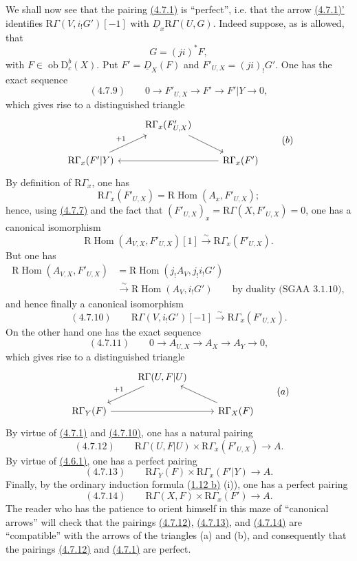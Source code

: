 \documentclass[11pt]{article}
\DeclareMathOperator{\Hom}{Hom}
\newcommand{\R}{\mathrm{R}}
\newcommand{\D}{\mathrm{D}}
\newcommand{\ob}{\operatorname{ob}}
\providecommand{\Hom}{\operatorname{Hom}}
\providecommand{\ob}{\operatorname{ob}}
\providecommand{\R}{\mathrm R}
\providecommand{\Hom}{\operatorname{Hom}}
\begin{document}
We shall now see that the pairing \hyperref[sga5:I:equation:4.7.1]{(4.7.1)} is ``perfect'', i.e. that the arrow \hyperref[sga5:I:equation:4.7.1:2]{(4.7.1)'} identifies $\R\Gamma(V,i_!G')[-1]$ with $\underline{D}_x\R\Gamma(U,G)$. Indeed suppose, as is allowed, that
\[
G=(ji)^*F,
\]
with $F\in\ob\D_c^b(X)$. Put $F'=\underline{D}_X(F)$ and $F'_{U,X}=(ji)_!G'$. One has the exact sequence
\label{sga5:I:equation:4.7.9}\[
(4.7.9)\qquad 0\longrightarrow F'_{U,X}\longrightarrow F'\longrightarrow F'|Y\longrightarrow0,
\]
which gives rise to a distinguished triangle
\[
\begin{tikzcd}
& \R\Gamma_x(F'_{U,X}) \arrow[dr] \\
\R\Gamma_x(F'|Y) \arrow[ur,"{+1}"] && \R\Gamma_x(F') \arrow[ll]
\end{tikzcd}
\qquad (b)
\]
By definition of $\R\Gamma_x$, one has
\[
\R\Gamma_x(F'_{U,X})=\R\Hom(A_x,F'_{U,X});
\]
hence, using \hyperref[sga5:I:equation:4.7.7]{(4.7.7)} and the fact that $(F'_{U,X})_x=\R\Gamma(X,F'_{U,X})=0$, one has a canonical isomorphism
\[
\R\Hom(A_{V,X},F'_{U,X})[1]\xrightarrow{\sim}\R\Gamma_x(F'_{U,X}).
\]
But one has
\[
\begin{aligned}
\R\Hom(A_{V,X},F'_{U,X})&=\R\Hom(j_!A_V,j_!i_!G')\\
&\xrightarrow{\sim}\R\Hom(A_V,i_!G')\qquad\text{by duality (SGAA~3.1.10)},
\end{aligned}
\]
and hence finally a canonical isomorphism
\label{sga5:I:equation:4.7.10}\[
(4.7.10)\qquad \R\Gamma(V,i_!G')[-1]\xrightarrow{\sim}\R\Gamma_x(F'_{U,X}).
\]
On the other hand one has the exact sequence
\label{sga5:I:equation:4.7.11}\[
(4.7.11)\qquad 0\longrightarrow A_{U,X}\longrightarrow A_X\longrightarrow A_Y\longrightarrow0,
\]
which gives rise to a distinguished triangle
\[
\begin{tikzcd}
& \R\Gamma(U,F|U) \arrow[dl,"{+1}"'] \\
\R\Gamma_Y(F) \arrow[rr] && \R\Gamma_X(F) \arrow[ul]
\end{tikzcd}
\qquad (a)
\]
By virtue of \hyperref[sga5:I:equation:4.7.1]{(4.7.1)} and \hyperref[sga5:I:equation:4.7.10]{(4.7.10)}, one has a natural pairing
\label{sga5:I:equation:4.7.12}\[
(4.7.12)\qquad \R\Gamma(U,F|U)\times\R\Gamma_x(F'_{U,X})\longrightarrow A.
\]
By virtue of \hyperref[sga5:I:equation:4.6.1]{(4.6.1)}, one has a perfect pairing
\label{sga5:I:equation:4.7.13}\[
(4.7.13)\qquad \R\Gamma_Y(F)\times\R\Gamma_x(F'|Y)\longrightarrow A.
\]
Finally, by the ordinary induction formula (\hyperref[sga5:I:proposition:1.12]{1.12 b)} (i)), one has a perfect pairing
\label{sga5:I:equation:4.7.14}\[
(4.7.14)\qquad \R\Gamma(X,F)\times\R\Gamma_x(F')\longrightarrow A.
\]
The reader who has the patience to orient himself in this maze of ``canonical arrows'' will check that the pairings \hyperref[sga5:I:equation:4.7.12]{(4.7.12)}, \hyperref[sga5:I:equation:4.7.13]{(4.7.13)}, and \hyperref[sga5:I:equation:4.7.14]{(4.7.14)} are ``compatible'' with the arrows of the triangles (a) and (b), and consequently that the pairings \hyperref[sga5:I:equation:4.7.12]{(4.7.12)} and \hyperref[sga5:I:equation:4.7.1]{(4.7.1)} are perfect.
\end{document}
